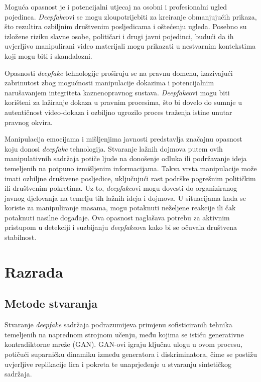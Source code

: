 \documentclass[seminarski, times, utf8]{fer}
\begin{document}
Moguća opasnost je i potencijalni utjecaj na osobni i profesionalni ugled pojedinca. \textit{Deepfake}ovi se mogu zloupotrijebiti za kreiranje obmanjujućih prikaza, što rezultira ozbiljnim društvenim posljedicama i oštećenju ugleda. Posebno su izložene riziku slavne osobe, političari i drugi javni pojedinci, budući da ih uvjerljivo manipulirani video materijali mogu prikazati u nestvarnim kontekstima koji mogu biti i skandalozni.

Opasnosti \textit{deepfake} tehnologije proširuju se na pravnu domenu, izazivajući zabrinutost zbog mogućnosti manipulacije dokazima i potencijalnim narušavanjem integriteta kaznenopravnog sustava. \textit{Deepfake}ovi mogu biti korišteni za lažiranje dokaza u pravnim procesima, što bi dovelo do sumnje u autentičnost video-dokaza i ozbiljno ugrozilo proces traženja istine unutar pravnog okvira.

Manipulacija emocijama i mišljenjima javnosti predstavlja značajnu opasnost koju donosi \textit{deepfake} tehnologija. Stvaranje lažnih dojmova putem ovih manipulativnih sadržaja potiče ljude na donošenje odluka ili podržavanje ideja temeljenih na potpuno izmišljenim informacijama. Takva vrsta manipulacije može imati ozbiljne društvene posljedice, uključujući rast podrške pogrešnim političkim ili društvenim pokretima. Uz to, \textit{deepfake}ovi mogu dovesti do organiziranog javnog djelovanja na temelju tih lažnih ideja i dojmova. U situacijama kada se koriste za manipuliranje masama, mogu potaknuti neželjene reakcije ili čak potaknuti nasilne događaje. Ova opasnost naglašava potrebu za aktivnim pristupom u detekciji i suzbijanju \textit{deepfake}ova kako bi se očuvala društvena stabilnost.



\chapter{Razrada}
\section{Metode stvaranja}
Stvaranje \textit{deepfake} sadržaja podrazumijeva primjenu sofisticiranih tehnika temeljenih na naprednom strojnom učenju, među kojima se ističu generativne kontradiktorne mreže (GAN). GAN-ovi igraju ključnu ulogu u ovom procesu, potičući suparničku dinamiku između generatora i diskriminatora, čime se postižu uvjerljive replikacije lica i pokreta te unaprjeđenje u stvaranju sintetičkog sadržaja.
\end{document}
